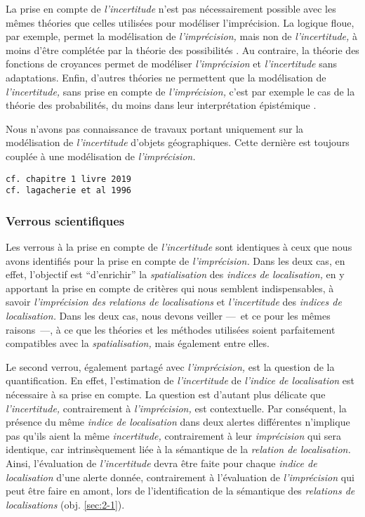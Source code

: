 La prise en compte de \emph{l'incertitude} n'est pas nécessairement
possible avec les mêmes théories que celles utilisées pour modéliser
l'imprécision. La logique floue, par exemple, permet la modélisation
de \emph{l'imprécision,} mais non de \emph{l'incertitude,} à moins
d'être complétée par la théorie des possibilités
\autocite{Bouchon-Meunier1995,Bouchon-Meunier2007}. Au contraire, la
théorie des fonctions de croyances permet de modéliser
\emph{l'imprécision} et \emph{l'incertitude} sans adaptations. Enfin,
d'autres théories ne permettent que la modélisation de
\emph{l'incertitude,} sans prise en compte de \emph{l'imprécision,}
c'est par exemple le cas de la théorie des probabilités, du moins dans
leur interprétation épistémique \autocite{Hajek2019}.

Nous n'avons pas connaissance de travaux portant uniquement sur la
modélisation de \emph{l'incertitude} d'objets géographiques. Cette
dernière est toujours couplée à une modélisation de
\emph{l'imprécision.}

\begin{verbatim}
cf. chapitre 1 livre 2019
cf. lagacherie et al 1996
\end{verbatim}

\subsubsection{Verrous scientifiques}

Les verrous à la prise en compte de \emph{l'incertitude} sont
identiques à ceux que nous avons identifiés pour la prise en compte de
\emph{l'imprécision.} Dans les deux cas, en effet, l'objectif est
\enquote{d'enrichir} la \emph{spatialisation} des \emph{indices de
  localisation,} en y apportant la prise en compte de critères qui
nous semblent indispensables, à savoir \emph{l'imprécision des
  relations de localisations} et \emph{l'incertitude} des
\emph{indices de localisation.} Dans les deux cas, nous devons veiller
---~et ce pour les mêmes raisons~---, à ce que les théories et les
méthodes utilisées soient parfaitement compatibles avec la
\emph{spatialisation,} mais également entre elles.

Le second verrou, également partagé avec \emph{l'imprécision,} est la
question de la quantification. En effet, l'estimation de
\emph{l'incertitude} de \emph{l'indice de localisation} est nécessaire
à sa prise en compte. La question est d'autant plus délicate que
\emph{l'incertitude,} contrairement à \emph{l'imprécision,} est
contextuelle. Par conséquent, la présence du même \emph{indice de
  localisation} dans deux alertes différentes n'implique pas qu'ils
aient la même \emph{incertitude,} contrairement à leur
\emph{imprécision} qui sera identique, car intrinsèquement liée à la
sémantique de la \emph{relation de localisation.} Ainsi, l'évaluation
de \emph{l'incertitude} devra être faite pour chaque \emph{indice de
  localisation} d'une alerte donnée, contrairement à l'évaluation de
\emph{l'imprécision} qui peut être faire en amont, lors de
l’identification de la sémantique des \emph{relations de
  localisations} (obj. \ref{sec:2-1}).

